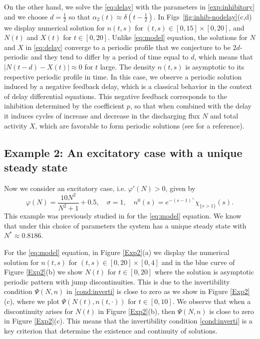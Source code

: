 \documentclass[11pt,a4paper]{article}
\begin{document}
On the other hand, we solve the \eqref{eq:delay} with the parameters in \eqref{exp:inhibitory} and we choose $d=\frac12$ so that $\alpha_2(t)\approx \delta(t-\frac12)$. In Figs~\ref{fig:inhib-nodelay}(c,d) we display numerical solution for $n(t,s)$ for $(t,s)\in[0,15]\times[0,20]$, and $N(t)$ and $X(t)$ for $t\in[0,20]$. Unlike \eqref{eq:model} equation, the solutions for $N$ and $X$ in \eqref{eq:delay} converge to a periodic profile that we conjecture to be $2d$-periodic and they tend to differ by a period of time equal to $d$, which means that $|N(t-d)-X(t)|\approx 0$ for $t$ large. The density $n(t,s)$ is asymptotic to its respective periodic profile in time. In this case, we observe a periodic solution induced by a negative feedback delay, which is a classical behavior in the context of delay differential equations. This negative feedback corresponds to the inhibition determined by the coefficient $p$, so that when combined with the delay it induces cycles of increase and decrease in the discharging flux $N$ and total activity $X$, which are favorable to form periodic solutions (see \cite{diekmann2012delay} for a reference).

\subsection*{Example 2: An excitatory case with a unique steady state} 
Now we consider an excitatory case, i.e. $\varphi'(N)>0$, given by 
\begin{equation}\label{exp2:datums}
  \varphi(N)=\frac{10N^2}{N^2+1}+0.5,\quad \sigma=1,  \quad n^0(s)=e^{-(s-1)^+}\chi_{\{s>1\}}(s).
\end{equation}
This example was previously studied in \cite{torres2021elapsed} for the \eqref{eq:model} equation. We know that under this choice of parameters the system has a unique steady state with $N^*\approx 0.8186$. 

For the \eqref{eq:model} equation, in Figure \ref{Exp2}(a) we display the numerical solution for $n(t,s)$ for $(t,s)\in[0,20]\times[0,4]$ and in  the blue curve of Figure \ref{Exp2}(b) we show $N(t)$ for $t\in[0,20]$ where the solution is asymptotic periodic pattern with jump discontinuities. This is due to the invertibility condition $\Psi(N,n)$ in \eqref{cond:inverti} is close to zero as we show in Figure \ref{Exp2}(c), where we plot $\Psi(N(t),n(t,\cdot))$ for $t\in[0,10]$. We observe that when a discontinuity arises for $N(t)$ in Figure \ref{Exp2}(b), then $\Psi(N,n)$ is close to zero in Figure \ref{Exp2}(c). This means that the invertibility condition \eqref{cond:inverti} is a key criterion that determine the existence and continuity of solutions.
\end{document}
